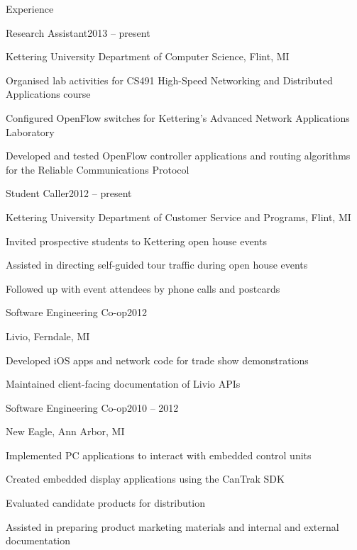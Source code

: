 \documentclass[letterpaper,12pt,oneside,compact]{article}
\begin{document}
\begin{heading}{Experience}
\begin{resitem}{Research Assistant\hfill 2013 -- present}
\item Kettering University Department of Computer Science, Flint, MI
\item Organised lab activities for CS491 High-Speed Networking and 
      Distributed Applications course
\item Configured OpenFlow switches for Kettering's Advanced Network 
      Applications Laboratory
\item Developed and tested OpenFlow controller applications and routing algorithms 
      for the Reliable Communications Protocol
\end{resitem}

\begin{resitem}{Student Caller\hfill 2012 -- present}
\item Kettering University Department of Customer Service and Programs, Flint, MI
\item Invited prospective students to Kettering open house events
\item Assisted in directing self-guided tour traffic during open house events
\item Followed up with event attendees by phone calls and postcards
\end{resitem}

\begin{resitem}{Software Engineering Co-op\hfill 2012}
\item Livio, Ferndale, MI
\item Developed iOS apps and network code for trade show demonstrations
\item Maintained client-facing documentation of Livio APIs
\end{resitem}

\begin{resitem}{Software Engineering Co-op\hfill 2010 -- 2012}
\item New Eagle, Ann Arbor, MI
\item Implemented PC applications to interact with embedded control units
\item Created embedded display applications using the CanTrak SDK
\item Evaluated candidate products for distribution
\item Assisted in preparing product marketing materials and internal and 
      external documentation
\end{resitem}
\end{heading}
\end{document}
